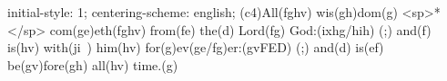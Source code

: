 initial-style: 1;
centering-scheme: english;
(c4)All(fghv) wis(gh)dom(g) <sp>*</sp> com(ge)eth(fghv) from(fe) the(d) Lord(fg) God:(ixhg/hih) (;) and(f) is(hv) with(ji~) him(hv) for(g)ev(ge/fg)er:(gvFED) (;) and(d) is(ef) be(gv)fore(gh) all(hv) time.(g)
